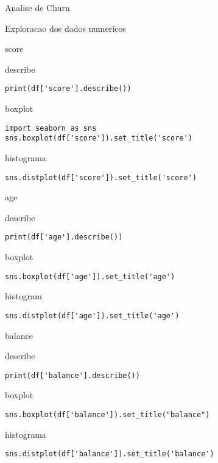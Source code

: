 \documentclass[presentation]{beamer}
\begin{document}
\begin{frame}[label={sec:org6b1fb3e},fragile]{Analise de Churn}
\begin{block}{Exploracao dos dados numericos}
\begin{block}{score}
\begin{block}{describe}
\begin{verbatim}
print(df['score'].describe())
\end{verbatim}
\end{block}
\begin{block}{boxplot}
\begin{verbatim}
import seaborn as sns
sns.boxplot(df['score']).set_title('score')
\end{verbatim}
\end{block}
\begin{block}{histograma}
\begin{verbatim}
sns.distplot(df['score']).set_title('score')
\end{verbatim}
\end{block}
\end{block}
\begin{block}{age}
\begin{block}{describe}
\begin{verbatim}
print(df['age'].describe())
\end{verbatim}
\end{block}
\begin{block}{boxplot}
\begin{verbatim}
sns.boxplot(df['age']).set_title('age')
\end{verbatim}
\end{block}
\begin{block}{histogram}
\begin{verbatim}
sns.distplot(df['age']).set_title('age')
\end{verbatim}
\end{block}
\end{block}
\begin{block}{balance}
\begin{block}{describe}
\begin{verbatim}
print(df['balance'].describe())
\end{verbatim}
\end{block}
\begin{block}{boxplot}
\begin{verbatim}
sns.boxplot(df['balance']).set_title("balance")
\end{verbatim}
\end{block}
\begin{block}{histograma}
\begin{verbatim}
sns.distplot(df['balance']).set_title('balance')

\end{verbatim}
\end{block}
\end{block}
\end{block}
\end{frame}
\end{document}
